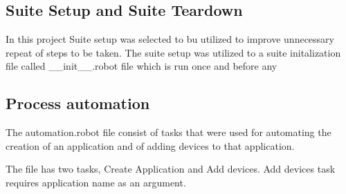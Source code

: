 \subsection{Suite Setup and Suite Teardown}
In this project Suite setup was selected to bu utilized to improve unnecessary repeat of steps to be taken.
The suite setup was utilized to a suite initalization file called \_\_init\_\_.robot file which is run once and before any

\subsection{Process automation}
The automation.robot file consist of tasks that were used for automating the creation of an application and of adding devices to that application.

The file has two tasks, Create Application and Add devices.
Add devices task requires application name as an argument.

\cite{chirpstack:getting_started}
\cite{robot_framwework_user_guide:suite_setup_and_teardown}
\clearpage %
